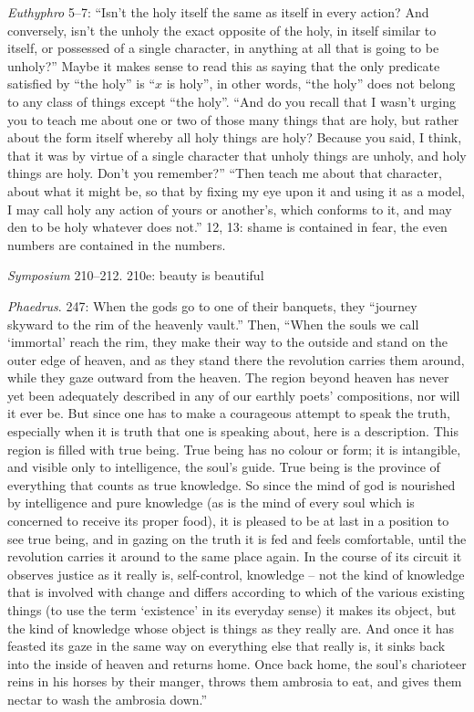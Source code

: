 \documentclass{article}
\theoremstyle{definition}
\begin{document}
{\em Euthyphro} \cite{euthyphro} 5--7: ``Isn't the holy itself the same as itself in every action? And conversely, isn't the unholy the exact opposite of the holy, in itself
similar to itself, or possessed of a single character, in anything at all that is going to be unholy?'' Maybe it makes sense to read this as saying that the only predicate satisfied by
``the holy'' is ``$x$ is holy'', in other words, ``the holy'' does not belong to any class of things except ``the holy''. ``And do you recall that I wasn't urging you to teach me about one or two
of those many things that are holy, but rather about the form itself whereby all holy things are holy? Because you said, I think, that it was by virtue of a single character that unholy
things are unholy, and holy things are holy. Don't you remember?'' ``Then teach me about that character, about what it might be, so that by fixing my eye upon it and using it as a model, I may call
holy any action of yours or another's, which conforms to it, and may den to be holy whatever does not.'' 12, 13: shame is contained in fear, the even numbers are contained
in the numbers.

{\em Symposium} 210--212. 210e: beauty is beautiful

{\em Phaedrus}. 247: When the gods go to one of their banquets, they ``journey skyward to the rim of the heavenly vault.'' Then,
``When the souls we call `immortal' reach the rim, they make their way to the outside and stand on the outer edge of heaven,
and as they stand there the revolution carries them around, while they gaze outward from the heaven. The region beyond heaven has never
yet been adequately described in any of our earthly poets' compositions, nor will it ever be. But since one has to make a courageous
attempt to speak the truth, especially when it is truth that one is speaking about, here is a description. This region is filled with true being.
True being has no colour or form; it is intangible, and visible only to intelligence, the soul's guide. True being is the province
of everything that counts as true knowledge. So since the mind of god is nourished by intelligence and pure knowledge
(as is the mind of every soul which is concerned to receive its proper food), it is pleased to be at last in a position to see true being,
and in gazing on the truth it is fed and feels comfortable, until the revolution carries it around to the same place again. In the course of its
circuit it observes justice as it really is, self-control, knowledge -- not the kind of knowledge that is involved with change and differs
according to  which of the various existing things (to use the term `existence' in its everyday sense) it makes its object, but the kind of knowledge
whose object is things as they really are. And once it has feasted its gaze in the same way on everything else that really is, it sinks
back into the inside of heaven and returns home. Once back home, the soul's charioteer reins in his horses by their manger,
throws them ambrosia to eat, and gives them nectar to wash the ambrosia down.'' \cite[pp.~29--30]{waterfieldphaedrus}
\end{document}
